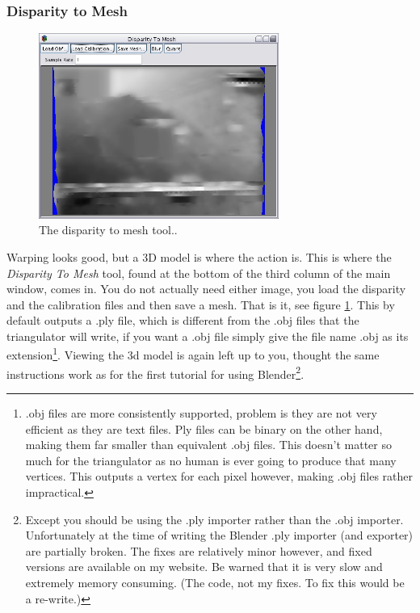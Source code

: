 \documentclass[10pt,a4paper,twoside]{article}
\begin{document}
\subsubsection {Disparity to Mesh}

\begin{figure}
 \centering
 \includegraphics[width=0.7\textwidth]{screenshots/disparity_to_mesh}
 \caption{The disparity to mesh tool..}
 \label{fig:disp_mesh}
\end{figure}

Warping looks good, but a 3D model is where the action is. This is where the \emph{Disparity To Mesh} tool, found at the bottom of the third column of the main window, comes in. You do not actually need either image, you load the disparity and the calibration files and then save a mesh. That is it, see figure \ref{fig:disp_mesh}. This by default outputs a .ply file, which is different from the .obj files that the triangulator will write, if you want a .obj file simply give the file name .obj as its extension\footnote{.obj files are more consistently supported, problem is they are not very efficient as they are text files. Ply files can be binary on the other hand, making them far smaller than equivalent .obj files. This doesn't matter so much for the triangulator as no human is ever going to produce that many vertices. This outputs a vertex for each pixel however, making .obj files rather impractical.}. Viewing the 3d model is again left up to you, thought the same instructions work as for the first tutorial for using Blender\footnote{Except you should be using the .ply importer rather than the .obj importer. Unfortunately at the time of writing the Blender .ply importer (and exporter) are partially broken. The fixes are relatively minor however, and fixed versions are available on my website. Be warned that it is very slow and extremely memory consuming. (The code, not my fixes. To fix this would be a re-write.)}.
\end{document}
